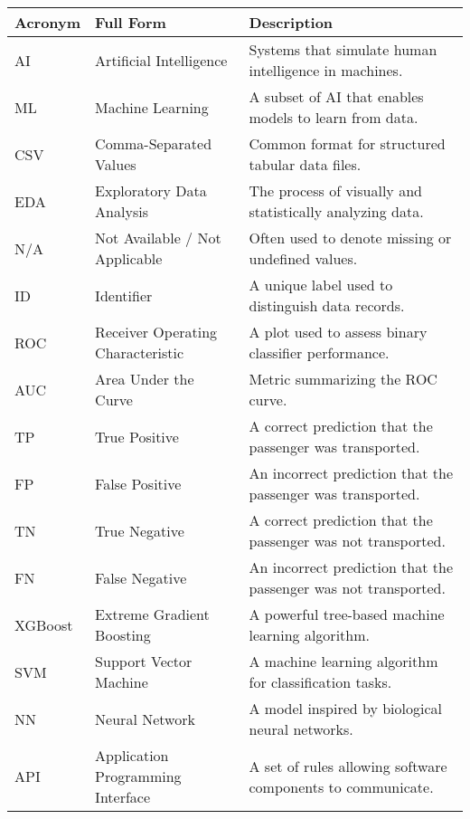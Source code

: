 \documentclass[15pt]{article}
\begin{document}
\begin{table}[h!]
    \centering
    \begin{tabular}{|l|l|p{8cm}|}
    \hline
    \textbf{Acronym} & \textbf{Full Form} & \textbf{Description} \\
    \hline
    AI       & Artificial Intelligence            & Systems that simulate human intelligence in machines. \\
    ML       & Machine Learning                   & A subset of AI that enables models to learn from data. \\
    CSV      & Comma-Separated Values             & Common format for structured tabular data files. \\
    EDA      & Exploratory Data Analysis          & The process of visually and statistically analyzing data. \\
    N/A      & Not Available / Not Applicable     & Often used to denote missing or undefined values. \\
    ID       & Identifier                         & A unique label used to distinguish data records. \\
    ROC      & Receiver Operating Characteristic & A plot used to assess binary classifier performance. \\
    AUC      & Area Under the Curve               & Metric summarizing the ROC curve. \\
    TP       & True Positive                      & A correct prediction that the passenger was transported. \\
    FP       & False Positive                     & An incorrect prediction that the passenger was transported. \\
    TN       & True Negative                      & A correct prediction that the passenger was not transported. \\
    FN       & False Negative                     & An incorrect prediction that the passenger was not transported. \\
    XGBoost  & Extreme Gradient Boosting          & A powerful tree-based machine learning algorithm. \\
    SVM      & Support Vector Machine             & A machine learning algorithm for classification tasks. \\
    NN       & Neural Network                     & A model inspired by biological neural networks. \\
    API      & Application Programming Interface  & A set of rules allowing software components to communicate. \\

\end{tabular}
\end{table}
\end{document}

